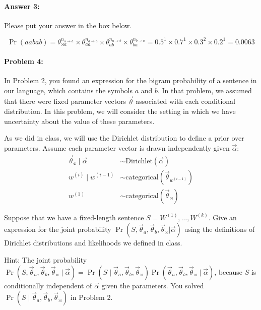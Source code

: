 \documentclass[10pt]{article}
\newenvironment{AnswerBox}{\begin{mdframed}[style=simple]}{\end{mdframed}}
\begin{document}
\paragraph{Answer 3:} Please put your answer in the box below.


\begin{AnswerBox}%

    \[\Pr(aabab) = \theta_{\rtimes a}^{n_{\rtimes \rightarrow a}} \times \theta_{aa}^{n_{a \rightarrow a}} \times \theta_{ab}^{n_{a \rightarrow b}} \times \theta_{ba}^{n_{b \rightarrow a}} = 0.5^1 \times 0.7^1 \times 0.3^2 \times 0.2^1 = 0.0063\]

    
\end{AnswerBox}%


\hrulefill %

\paragraph{Problem 4:}

In Problem 2, you found an expression for the bigram probability of a
sentence in our language, which contains the symbols $a$ and $b$. In
that problem, we assumed that there were fixed parameter vectors
$\vec{\theta}$ associated with each conditional distribution. In this
problem, we will consider the setting in which we have uncertainty
about the value of these parameters.

 As we did in class, we will use the Dirichlet distribution to 
define a prior over parameters.  Assume each parameter vector is drawn
independently given $\vec{\alpha}$:
\begin{align}
\vec{\theta}_{\mathbf{c}} \mid \vec{\alpha} 
    &\sim\mathrm{Dirichlet}(\vec{\alpha}) \\
w^{(i)} \mid  w^{(i-1)} 
    &\sim\mathrm{categorical}(\vec{\theta}_{w^{(i-1)}}) \\
w^{(1)} 
    &\sim \mathrm{categorical}(\vec{\theta}_{\rtimes})\
\end{align}

 Suppose that we have a fixed-length sentence
$S=W^{(1)},\dots,W^{(k)}$. Give an expression for the joint
probability
$\Pr(S, \vec{\theta}_{a}, \vec{\theta}_{b}, \vec{\theta}_{\rtimes} |
\vec{\alpha})$
using the definitions of Dirichlet distributions and likelihoods we
defined in class.

Hint: The joint probability $\Pr(S, \vec\theta_a, \vec\theta_b, \vec\theta_\rtimes\mid\vec\alpha) 
= \Pr(S\mid\vec\theta_a, \vec\theta_b, \vec\theta_\rtimes)
\Pr(\vec\theta_a, \vec\theta_b, \vec\theta_\rtimes\mid\vec\alpha)$, 
because $S$ is conditionally independent of $\vec\alpha$ given the parameters. You solved $\Pr(S\mid\vec\theta_a, \vec\theta_b, \vec\theta_\rtimes)$ in Problem 2.
\end{document}
